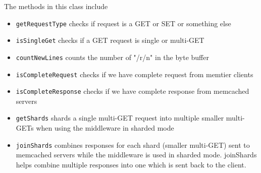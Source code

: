 \documentclass[11pt,a4paper]{article}
\begin{document}
	The methods in this class include
	\begin{itemize}
		\setlength{\itemsep}{0pt}
		\setlength{\parskip}{0pt}
		\setlength{\parsep}{0pt}
		\item \texttt{getRequestType} checks if request is a GET or SET or something else
		\item \texttt{isSingleGet} checks if a GET request is single or multi-GET
		\item \texttt{countNewLines} counts the number of "/r/n" in the byte buffer
		\item \texttt{isCompleteRequest} checks if we have complete request from memtier clients
		\item \texttt{isCompleteResponse} checks if we have complete response from memcached servers
		\item \texttt{getShards} shards a single multi-GET request into multiple smaller multi-GETs when using the middleware in sharded mode
		\item \texttt{joinShards} combines responses for each shard (smaller multi-GET) sent to memcached servers while the middleware is used in sharded mode. joinShards helps combine multiple responses into one which is sent back to the client.
	\end{itemize}
	
\end{document}
